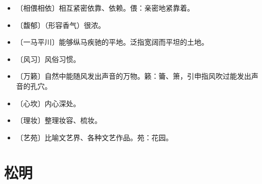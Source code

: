 \documentclass[12pt,UTF-8,openany]{ctexbook}
\begin{document}
\begin{itemize}
    \setlength\itemsep{-0.2em}
    \item 〔相偎相依〕相互紧密依靠、依赖。偎：亲密地紧靠着。
    \item 〔馥郁〕（形容香气）很浓。
    \item 〔一马平川〕能够纵马疾驰的平地。泛指宽阔而平坦的土地。
    \item 〔风习〕风俗习惯。
    \item 〔万籁〕自然中能随风发出声音的万物。籁：籥、箫，引申指风吹过能发出声音的孔穴。
    \item 〔心坎〕内心深处。
    \item 〔理妆〕整理妆容、梳妆。
    \item 〔艺苑〕比喻文艺界、各种文艺作品。苑：花园。
\end{itemize}

\chapter{松明}
\end{document}
